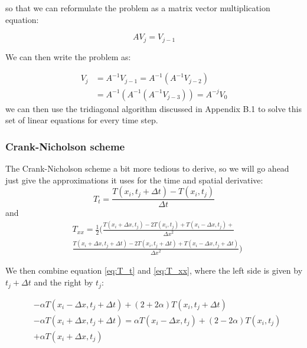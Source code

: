 \documentclass{article}
\begin{document}
\begin{multicols}{2}
so that we can reformulate the problem as a matrix vector multiplication equation:

\begin{equation}
A V_j=V_{j-1}
\end{equation}

We can then write the problem as:

\begin{equation}
\begin{split}
V_j &= A^{-1}V_{j-1}=A^{-1}(A^{-1}V_{j-2})\\
&=A^{-1}(A^{-1}(A^{-1}V_{j-3}))=A^{-j}V_0
\end{split}
\end{equation}
we can then use the tridiagonal algorithm discussed in Appendix B.1 to solve this set of linear equations for every time step. 

\subsubsection{Crank-Nicholson scheme}

The Crank-Nicholson scheme a bit more tedious to derive, so we will go ahead just give the approximations it uses for the time and spatial derivative:
\begin{equation}
T_t = \frac{T(x_i,t_j+\Delta t)-T(x_i,t_j)}{\Delta t}
\label{eq:T_t}
\end{equation}
and 
\begin{equation}
\begin{split}
&T_{xx}=\frac{1}{2}\bigg( \frac{T(x_i+\Delta x, t_j)-2T(x_i,t_j)+T(x_i-\Delta x, t_j)+}{{\Delta x}^2} \\
&\frac{T(x_i + \Delta x, t_j + \Delta t )-2T(x_i,t_j+\Delta t)+T(x_i -\Delta x, t_j + \Delta t)}{{\Delta x}^2}\bigg)
\label{eq:T_xx}
\end{split}
\end{equation}

We then combine equation \ref{eq:T_t} and \ref{eq:T_xx}, where the left side is given by $t_j+\Delta t$ and the right by $t_j$:

\begin{equation}
\begin{split}
&-\alpha T(x_i-\Delta x, t_j+\Delta t)+(2+2\alpha) T(x_i, t_j+\Delta t)\\
&-\alpha T(x_i+\Delta x,t_j+\Delta t)=\alpha T(x_i-\Delta x, t_j)+(2-2\alpha)T(x_i,t_j)\\
&+\alpha T(x_i+\Delta x, t_j)
\end{split}
\end{equation}


\end{multicols}
\end{document}
